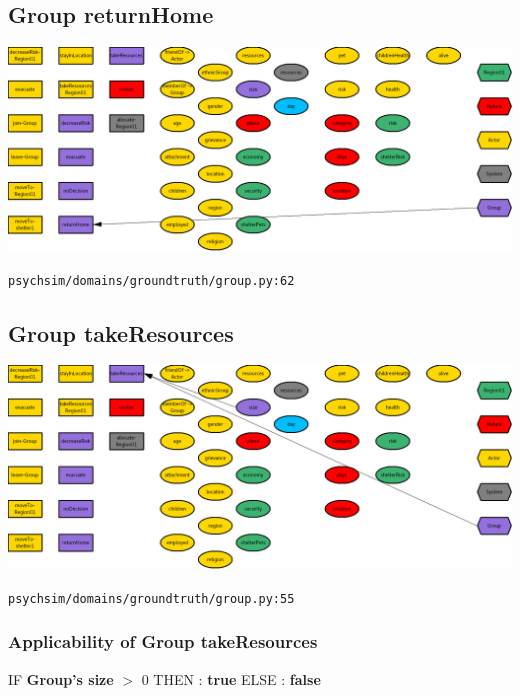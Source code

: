 \documentclass{article}%
\begin{document}
%
\subsection{Group returnHome}%
\label{subsec:Group returnHome}%
\includegraphics[width=\textwidth]{images/Group-returnHome.png}%
\begin{flushleft}%
\verb|psychsim/domains/groundtruth/group.py:62|%
\end{flushleft}

%
\subsection{Group takeResources}%
\label{subsec:Group takeResources}%
\includegraphics[width=\textwidth]{images/Group-takeResources.png}%
\begin{flushleft}%
\verb|psychsim/domains/groundtruth/group.py:55|%
\end{flushleft}%
\subsubsection{Applicability of Group takeResources}%
\label{ssubsec:Applicability of Group takeResources}%
\begin{flushleft}%
IF %
\textbf{Group's size}%
$>$%
0%
\linebreak%
\hspace*{2em}%
THEN %
: %
\textbf{true}%
\linebreak%
\hspace*{2em}%
ELSE %
: %
\textbf{false}%
\end{flushleft}
\end{document}
